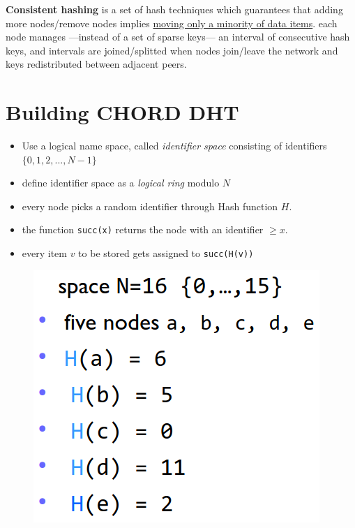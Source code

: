 \textbf{Consistent hashing} is a set of hash techniques which guarantees that adding more nodes/remove nodes implies \ul{moving only a minority of data items}.
each node manages ---instead of a set of sparse keys--- an interval of consecutive hash keys, and intervals are joined/splitted when nodes join/leave the network and keys redistributed between adjacent peers.


\section{Building CHORD DHT}
\begin{paracol}{2}
   \begin{itemize}
      \item Use a logical name space, called \textit{identifier space} consisting of identifiers
      $\{0,1,2,...,N-1\}$
      \item define identifier space as a \textit{logical ring} modulo $N$
      \item every node picks a random identifier
      through Hash function $H$.
      \item the function \texttt{succ(x)} returns the node with an identifier $\geq x$.
      \item every item $v$ to be stored gets assigned to \texttt{succ(H(v))}
   \end{itemize}
   \begin{figure}[htbp]
      \centering
      \includegraphics{images/DHT_build2.png}
      \label{fig:DHT_build2}
   \end{figure}

   \switchcolumn
   

\end{paracol}
